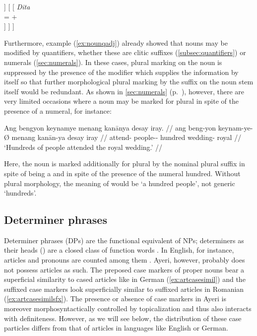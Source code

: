 \a\label{ex:animclashname} %
\ljudge*\begin{forest}
[\anno{\xhead{N}}
	[\anno{Cl}
		[{%
			\textit{eng} \\
			\ups{\Anim} = $-$ \\
			\ups{\Case} = \Aarg{} \\
		}]
	]
	[
		[{%
			\textit{Dita} \\
			\ups{\Anim} = $+$ \\
		}]
	]
]
\end{forest}
\xe

Furthermore, example (\ref{ex:nounqadj}) already showed that nouns may be
modified by quantifiers, whether these are clitic suffixes
(\autoref{subsec:quantifiers}) or numerals (\autoref{sec:numerals}). In these
cases, plural marking on the noun is suppressed by the presence of the modifier
which supplies the information by itself so that further morphological plural
marking by the suffix  on the noun stem itself would be
redundant. As shown in \autoref{sec:numerals} (p.~\pageref{hundreds}), however,
there are very limited occasions where a noun may be marked for plural in spite
of the presence of a numeral, for instance:

\ex\begingl
	\gla Ang bengyon keynamye menang kanānya {desay iray}. //
	\glb ang beng-yon keynam-ye-Ø menang kanān-ya {desay iray} //
	\glc \AgtT{} attend-\TplN{} people-\Pl{}-\Top{} hundred wedding-\Loc{} 
		royal //
	\glft `Hundreds of people attended the royal wedding.' //
\endgl\xe

Here, the noun  is marked additionally for plural
by the nominal plural suffix  in spite of being a  and in spite of the presence of the numeral 
{hundred}. Without plural morphology, the meaning of  would be `a hundred people', not generic `hundreds'.

\subsection{Determiner phrases}
\label{subsec:dps}

Determiner phrases (DPs) are the functional equivalent of NPs; determiners as
their heads () are a closed class of function words \citep[102]
{bresnan2016}. In English, for instance, articles and pronouns are counted
among them \citep[208--211]{carnie2013}. Ayeri, however, probably does not
possess articles as such. The preposed case markers of proper nouns bear a
superficial similarity to cased articles like in German (\ref{ex:artcasesimil})
and the suffixed case markers look superficially similar to suffixed articles
in Romanian (\ref{ex:artcasesimilsfx}). The presence or absence of case markers
in Ayeri is moreover morphosyntactically controlled by topicalization and thus
also interacts with definiteness. However, as we will see below, the
distribution of these case particles differs from that of articles in languages
like English or German.

